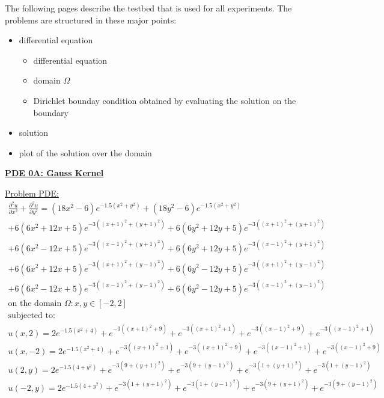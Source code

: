 \documentclass[.\jobname.tex]{subfiles}
\begin{document}
The following pages describe the testbed that is used for all experiments. The problems are structured in these major points: 
\begin{itemize}
	\item differential equation
	\begin{itemize}
		\item differential equation
		\item domain $\Omega$
		\item Dirichlet bounday condition obtained by evaluating the solution on the boundary
	\end{itemize}
	\item solution
	\item plot of the solution over the domain
\end{itemize}

\newpage

\underline{\textbf{PDE 0A: Gauss Kernel}}

\underline{Problem PDE: }
\begin{equation}
\label{eq:pde0a}
\begin{split}
\frac{\partial^2 u}{\partial x^2} + \frac{\partial^2 u}{\partial y^2} = (18x^2-6)e^{-1.5(x^2 + y^2)} + (18y^2-6)e^{-1.5(x^2 + y^2)} \\
+6(6x^2+12x+5)e^{-3((x+1)^2+(y+1)^2)} + 6(6y^2+12y+5)e^{-3((x+1)^2+(y+1)^2)} \\
+6(6x^2-12x+5)e^{-3((x-1)^2+(y+1)^2)} + 6(6y^2+12y+5)e^{-3((x-1)^2+(y+1)^2)} \\
+6(6x^2+12x+5)e^{-3((x+1)^2+(y-1)^2)} + 6(6y^2-12y+5)e^{-3((x+1)^2+(y-1)^2)} \\
+6(6x^2-12x+5)e^{-3((x-1)^2+(y-1)^2)} + 6(6y^2-12y+5)e^{-3((x-1)^2+(y-1)^2)} \\
\text{on the domain } \Omega : x, y \in [-2,2] \\
\text{subjected to: } \\
u(x,2) = 2e^{-1.5(x^2 + 4)} + e^{-3((x+1)^2 + 9)} + e^{-3((x+1)^2 + 1)} + e^{-3((x-1)^2 + 9)} + e^{-3((x-1)^2 + 1)} \\
u(x,-2)= 2e^{-1.5(x^2 + 4)} + e^{-3((x+1)^2 + 1)} + e^{-3((x+1)^2 + 9)} + e^{-3((x-1)^2 + 1)} + e^{-3((x-1)^2 + 9)} \\
u(2,y) = 2e^{-1.5(4 + y^2)} + e^{-3(9 + (y+1)^2)} + e^{-3(9 + (y-1)^2)} + e^{-3(1 + (y+1)^2)} + e^{-3(1 + (y-1)^2)} \\
u(-2,y)= 2e^{-1.5(4 + y^2)} + e^{-3(1 + (y+1)^2)} + e^{-3(1 + (y-1)^2)} + e^{-3(9 + (y+1)^2)} + e^{-3(9 + (y-1)^2)} \\
\end{split}
\end{equation}
\end{document}
